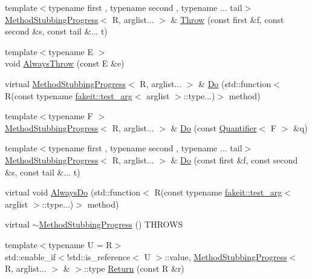 \begin{DoxyCompactItemize}
\item 
{\footnotesize template$<$typename first , typename second , typename ... tail$>$ }\\\mbox{\hyperlink{structfakeit_1_1MethodStubbingProgress}{Method\+Stubbing\+Progress}}$<$ R, arglist... $>$ \& \mbox{\hyperlink{structfakeit_1_1MethodStubbingProgress_a516a0ade529c61e4ab6df1bf47f3f1b2}{Throw}} (const first \&f, const second \&s, const tail \&... t)
\item 
{\footnotesize template$<$typename E $>$ }\\void \mbox{\hyperlink{structfakeit_1_1MethodStubbingProgress_a4efb736b0529123d9c5ed87630e11ac2}{Always\+Throw}} (const E \&e)
\item 
virtual \mbox{\hyperlink{structfakeit_1_1MethodStubbingProgress}{Method\+Stubbing\+Progress}}$<$ R, arglist... $>$ \& \mbox{\hyperlink{structfakeit_1_1MethodStubbingProgress_a9ef4c2db8e567aa312b708613d240ae1}{Do}} (std\+::function$<$ R(const typename \mbox{\hyperlink{structfakeit_1_1test__arg}{fakeit\+::test\+\_\+arg}}$<$ arglist $>$\+::type...)$>$ method)
\item 
{\footnotesize template$<$typename F $>$ }\\\mbox{\hyperlink{structfakeit_1_1MethodStubbingProgress}{Method\+Stubbing\+Progress}}$<$ R, arglist... $>$ \& \mbox{\hyperlink{structfakeit_1_1MethodStubbingProgress_a59f9d7ab7c86b809ce25b41d05b58ad2}{Do}} (const \mbox{\hyperlink{structfakeit_1_1Quantifier}{Quantifier}}$<$ F $>$ \&q)
\item 
{\footnotesize template$<$typename first , typename second , typename ... tail$>$ }\\\mbox{\hyperlink{structfakeit_1_1MethodStubbingProgress}{Method\+Stubbing\+Progress}}$<$ R, arglist... $>$ \& \mbox{\hyperlink{structfakeit_1_1MethodStubbingProgress_a157561400e37da65c5b48f4466fc603c}{Do}} (const first \&f, const second \&s, const tail \&... t)
\item 
virtual void \mbox{\hyperlink{structfakeit_1_1MethodStubbingProgress_a47464ab35cb06c00dbd00a13328b80a7}{Always\+Do}} (std\+::function$<$ R(const typename \mbox{\hyperlink{structfakeit_1_1test__arg}{fakeit\+::test\+\_\+arg}}$<$ arglist $>$\+::type...)$>$ method)
\item 
virtual \mbox{\hyperlink{structfakeit_1_1MethodStubbingProgress_aed2c96ce537706935976943354c49616}{$\sim$\+Method\+Stubbing\+Progress}} () T\+H\+R\+O\+WS
\item 
{\footnotesize template$<$typename U  = R$>$ }\\std\+::enable\+\_\+if$<$!std\+::is\+\_\+reference$<$ U $>$\+::value, \mbox{\hyperlink{structfakeit_1_1MethodStubbingProgress}{Method\+Stubbing\+Progress}}$<$ R, arglist... $>$ \& $>$\+::type \mbox{\hyperlink{structfakeit_1_1MethodStubbingProgress_ab97be63c322887db40cb788d28875fea}{Return}} (const R \&r)

\end{DoxyCompactItemize}
